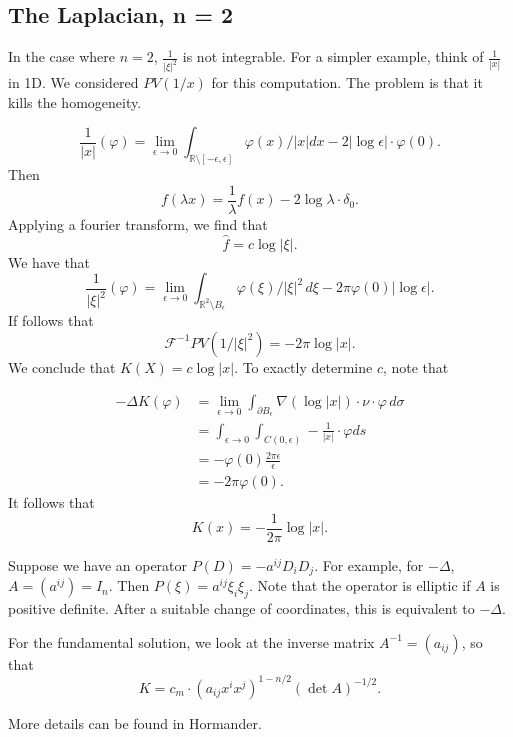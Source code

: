 \documentclass[12pt]{scrartcl}
\newcommand{\R}{\mathbb{R}}
\renewcommand{\hat}{\widehat}
\let \phi \varphi
\begin{document}
\subsection{The Laplacian, n = 2}
In the case where $n = 2$, $\frac{1}{|\xi|^2}$ is not integrable.  For a simpler example, think of $\frac{1}{|x|}$ in 1D.  We considered $PV(1/x)$ for this computation.  The problem is that it kills the homogeneity.  

$$\frac{1}{|x|} (\phi) = \lim_{\epsilon \to 0} \int_{\R \setminus [-\epsilon, \epsilon]} \phi(x)/|x|dx - 2|\log \epsilon| \cdot \phi(0).$$
Then 
$$f(\lambda x) = \frac{1}{\lambda }f(x) - 2\log \lambda \cdot \delta_0.$$
Applying a fourier transform, we find that 
$$\hat{f} = c \log |\xi|.$$
We have that 
$$\frac{1}{|\xi|^2}(\phi) = \lim_{\epsilon \to 0} \int_{\R^2 \setminus B_\epsilon} \phi(\xi)/|\xi|^2 \, d\xi - 2\pi \phi(0) |\log \epsilon|.$$
If follows that 
$$\mathcal F^{-1} PV(1/|\xi|^2) = - 2\pi \log |x|.$$
We conclude that $K(X) = c \log |x|$.  To exactly determine $c$, note that 

\begin{align*}
- \Delta K(\phi)&= \lim_{\epsilon \to 0} \int_{\partial B_\epsilon} \nabla (\log |x|)\cdot \nu \cdot \phi\,  d\sigma \\
&= \int_{\epsilon \to 0} \int_{C(0, \epsilon)} -\frac{1}{|x|} \cdot \phi ds \\
&= -\phi(0) \frac{2\pi \epsilon}{\epsilon}\\
&= -2\pi \phi(0). 
\end{align*}
It follows that 
$$K(x) = -\frac{1}{2\pi} \log|x|.$$
\begin{example}
Suppose we have an operator $P(D) = - a^{ij}D_iD_j.$  For example, for $-\Delta$, $A = (a^{ij}) = I_n$.  Then $P(\xi) = a^{ij} \xi_i \xi_j$.  Note that the operator is elliptic if $A$ is positive definite.  After a suitable change of coordinates, this is equivalent to $-\Delta$.

For the fundamental solution, we look at the inverse matrix $A^{-1} = (a_{ij})$, so that 
$$K = c_m \cdot (a_{ij} x^i x^j)^{1-n/2} (\det A)^{-1/2}.$$

More details can be found in Hormander.
\end{example}
\end{document}
